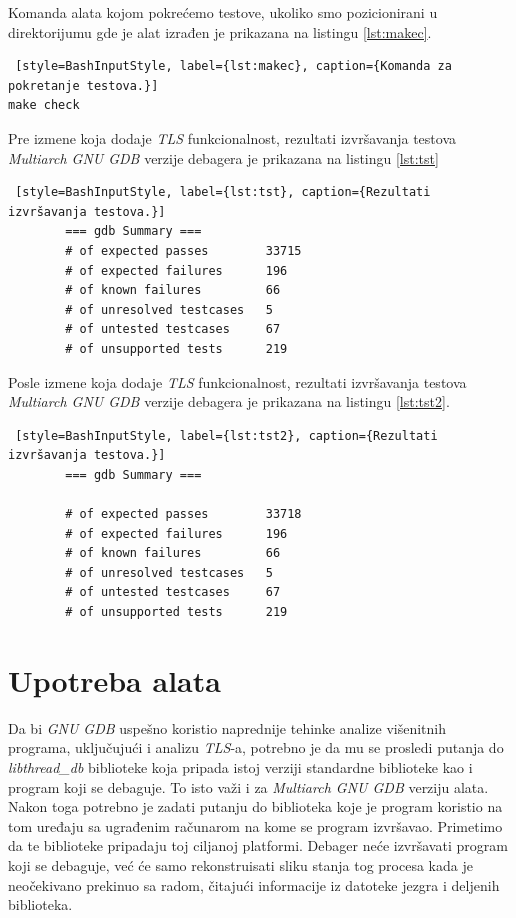 \documentclass[12pt,oneside]{memoir}
\begin{document}
Komanda alata kojom pokrećemo testove, ukoliko smo pozicionirani u direktorijumu gde je alat izrađen je prikazana na listingu \ref{lst:makec}.

\begin{lstlisting} [style=BashInputStyle, label={lst:makec}, caption={Komanda za pokretanje testova.}]
make check
\end{lstlisting}

Pre izmene koja dodaje \emph{TLS} funkcionalnost, rezultati izvršavanja testova \emph{Multiarch GNU GDB} verzije debagera je prikazana na listingu \ref{lst:tst}

\begin{lstlisting} [style=BashInputStyle, label={lst:tst}, caption={Rezultati izvršavanja testova.}]
		=== gdb Summary ===
		# of expected passes		33715
		# of expected failures		196
		# of known failures		    66
		# of unresolved testcases	5
		# of untested testcases		67
		# of unsupported tests		219
\end{lstlisting}
 
Posle izmene koja dodaje \emph{TLS} funkcionalnost, rezultati izvršavanja testova \emph{Multiarch GNU GDB} verzije debagera je prikazana na listingu \ref{lst:tst2}.

\begin{lstlisting} [style=BashInputStyle, label={lst:tst2}, caption={Rezultati izvršavanja testova.}]
		=== gdb Summary ===

		# of expected passes		33718
		# of expected failures		196
		# of known failures		    66
		# of unresolved testcases	5
		# of untested testcases		67
		# of unsupported tests		219
\end{lstlisting}

\section{Upotreba alata}

Da bi \emph{GNU GDB} uspešno koristio naprednije tehinke analize višenitnih programa, uključujući i analizu \emph{TLS}-a, potrebno je da mu se prosledi putanja do \emph{libthread\_db} biblioteke koja pripada istoj verziji standardne biblioteke kao i program koji se debaguje. To isto važi i za \emph{Multiarch GNU GDB} verziju alata. Nakon toga potrebno je zadati putanju do biblioteka koje je program koristio na tom uređaju sa ugrađenim računarom na kome se program izvršavao. Primetimo da te biblioteke pripadaju toj ciljanoj platformi. Debager neće izvršavati program koji se debaguje, već će samo rekonstruisati sliku stanja tog procesa kada je neočekivano prekinuo sa radom, čitajući informacije iz datoteke jezgra i deljenih biblioteka.
\end{document}
